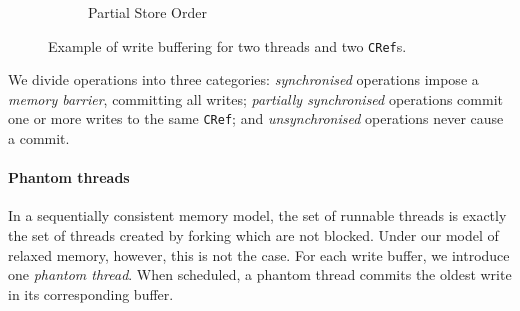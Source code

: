 \begin{figure}
\begin{subfigure}{0.3\textwidth}
    \caption{Partial Store Order}
  \end{subfigure}
  \caption{Example of write buffering for two threads and two \texttt{CRef}s.}
  \label{fig:wb}
\end{figure}

We divide operations into three categories: \emph{synchronised}
operations impose a \emph{memory barrier}, committing all writes;
\emph{partially synchronised} operations commit one or more writes to
the same \verb|CRef|; and \emph{unsynchronised} operations never cause
a commit.

\paragraph{Phantom threads}
In a sequentially consistent memory model, the set of runnable threads
is exactly the set of threads created by forking which are not
blocked.  Under our model of relaxed memory, however, this is not the
case.  For each write buffer, we introduce one \emph{phantom thread}.
When scheduled, a phantom thread commits the oldest write in its
corresponding buffer.


